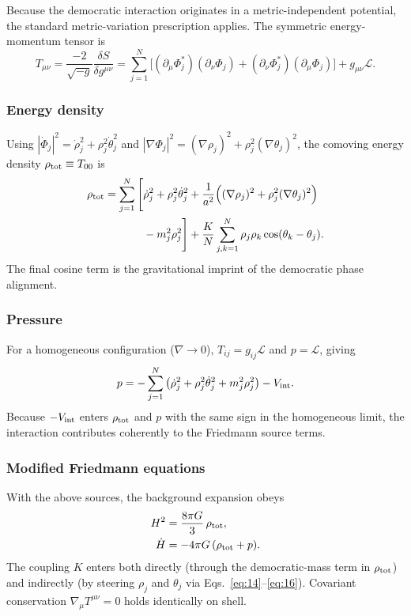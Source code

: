Because the democratic interaction originates in a metric-independent potential, the standard metric-variation prescription applies. The symmetric energy-momentum tensor is
\begin{equation}
T_{\mu\nu} = \frac{-2}{\sqrt{-g}}\frac{\delta S}{\delta g^{\mu\nu}}
= \sum_{j=1}^N\big[(\partial_\mu\Phi_j^*)(\partial_\nu\Phi_j)
+ (\partial_\nu\Phi_j^*)(\partial_\mu\Phi_j)\big]
+ g_{\mu\nu}\mathcal{L} .
\end{equation}

\subsubsection*{Energy density}
Using $|\dot{\Phi}_j|^2=\dot{\rho}_j^2+\rho_j^2\dot{\theta}_j^2$ and $|\nabla\Phi_j|^2=(\nabla\rho_j)^2+\rho_j^2(\nabla\theta_j)^2$, the comoving energy density $\rho_{\rm tot}\equiv T_{00}$ is
\begin{equation}
{
\begin{aligned}
\rho_{\rm tot} = \sum_{j=1}^N\Bigg[
&\dot{\rho}_j^2 + \rho_j^2\dot{\theta}_j^2
+ \frac{1}{a^2}\Big((\nabla\rho_j)^2 + \rho_j^2(\nabla\theta_j)^2\Big) \\
&- m_j^2\rho_j^2 \Bigg]
+ \frac{K}{N}\sum_{j,k=1}^N\rho_j\rho_k\cos(\theta_k-\theta_j) .
\end{aligned}
}
\end{equation}
The final cosine term is the gravitational imprint of the democratic phase alignment.

\subsubsection*{Pressure}
For a homogeneous configuration ($\nabla\to0$), $T_{ij}=g_{ij}\mathcal{L}$ and $p=\mathcal{L}$, giving
\begin{equation}
{
p = -\sum_{j=1}^N\big(\dot{\rho}_j^2 + \rho_j^2\dot{\theta}_j^2 + m_j^2\rho_j^2\big)
- V_{\rm int} .
}
\end{equation}
Because $-V_{\rm int}$ enters $\rho_{\rm tot}$ and $p$ with the same sign in the homogeneous limit, the interaction contributes coherently to the Friedmann source terms.

\subsubsection*{Modified Friedmann equations}
With the above sources, the background expansion obeys
\begin{align}
H^2 &= \frac{8\pi G}{3}\,\rho_{\rm tot}, \\
\dot{H} &= -4\pi G\,(\rho_{\rm tot}+p) .
\end{align}
The coupling $K$ enters both directly (through the democratic-mass term in $\rho_{\rm tot}$) and indirectly (by steering $\rho_j$ and $\theta_j$ via Eqs.~\eqref{eq:14}--\eqref{eq:16}). Covariant conservation $\nabla_\mu T^{\mu\nu}=0$ holds identically on shell.

